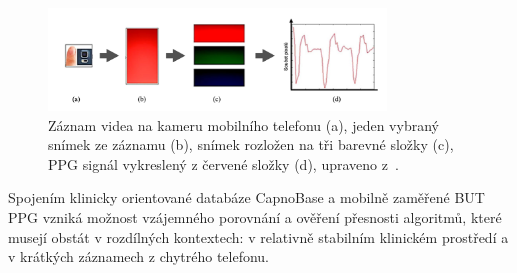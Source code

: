 \begin{figure}[ht]
	\centering
	\includegraphics[width=0.8\textwidth]{./obrazky/videoZaznamPPG.png}
	\caption[Získání PPG signálu pro databázi \acs{BUT PPG}]{Záznam videa na kameru mobilního telefonu (a), jeden vybraný snímek ze záznamu (b), snímek rozložen na tři barevné složky (c), PPG signál vykreslený z červené složky (d), upraveno z~\cite{Siddiqui2016}.}
	\label{fig:videoZaznamPPG}
\end{figure}

Spojením klinicky orientované databáze CapnoBase a mobilně zaměřené \acs{BUT PPG} vzniká možnost vzájemného porovnání a ověření přesnosti algoritmů, které musejí obstát v rozdílných kontextech: v relativně stabilním klinickém prostředí a v krátkých záznamech z chytrého telefonu.